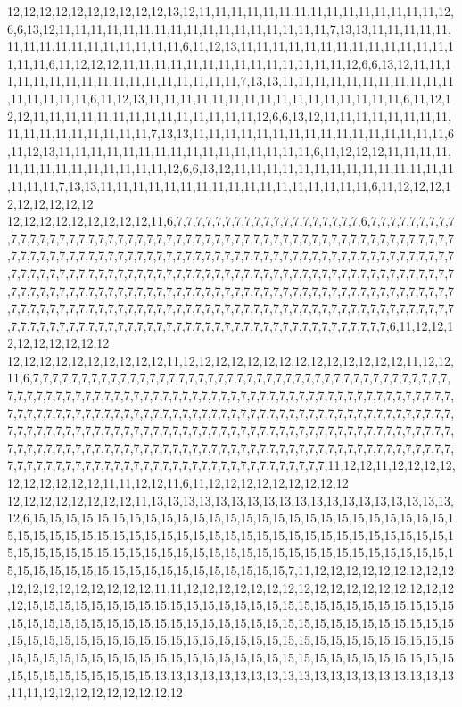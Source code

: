 12,12,12,12,12,12,12,12,12,12,13,12,11,11,11,11,11,11,11,11,11,11,11,11,11,11,11,12,6,6,13,12,11,11,11,11,11,11,11,11,11,11,11,11,11,11,11,11,11,7,13,13,11,11,11,11,11,11,11,11,11,11,11,11,11,11,11,11,6,11,12,13,11,11,11,11,11,11,11,11,11,11,11,11,11,11,11,11,6,11,12,12,12,11,11,11,11,11,11,11,11,11,11,11,11,11,11,12,6,6,13,12,11,11,11,11,11,11,11,11,11,11,11,11,11,11,11,11,11,7,13,13,11,11,11,11,11,11,11,11,11,11,11,11,11,11,11,11,6,11,12,13,11,11,11,11,11,11,11,11,11,11,11,11,11,11,11,11,6,11,12,12,12,11,11,11,11,11,11,11,11,11,11,11,11,11,11,12,6,6,13,12,11,11,11,11,11,11,11,11,11,11,11,11,11,11,11,11,11,7,13,13,11,11,11,11,11,11,11,11,11,11,11,11,11,11,11,11,6,11,12,13,11,11,11,11,11,11,11,11,11,11,11,11,11,11,11,11,6,11,12,12,12,11,11,11,11,11,11,11,11,11,11,11,11,11,11,12,6,6,13,12,11,11,11,11,11,11,11,11,11,11,11,11,11,11,11,11,11,7,13,13,11,11,11,11,11,11,11,11,11,11,11,11,11,11,11,11,11,6,11,12,12,12,12,12,12,12,12,12
12,12,12,12,12,12,12,12,12,11,6,7,7,7,7,7,7,7,7,7,7,7,7,7,7,7,7,7,7,7,6,7,7,7,7,7,7,7,7,7,7,7,7,7,7,7,7,7,7,7,7,7,7,7,7,7,7,7,7,7,7,7,7,7,7,7,7,7,7,7,7,7,7,7,7,7,7,7,7,7,7,7,7,7,7,7,7,7,7,7,7,7,7,7,7,7,7,7,7,7,7,7,7,7,7,7,7,7,7,7,7,7,7,7,7,7,7,7,7,7,7,7,7,7,7,7,7,7,7,7,7,7,7,7,7,7,7,7,7,7,7,7,7,7,7,7,7,7,7,7,7,7,7,7,7,7,7,7,7,7,7,7,7,7,7,7,7,7,7,7,7,7,7,7,7,7,7,7,7,7,7,7,7,7,7,7,7,7,7,7,7,7,7,7,7,7,7,7,7,7,7,7,7,7,7,7,7,7,7,7,7,7,7,7,7,7,7,7,7,7,7,7,7,7,7,7,7,7,7,7,7,7,7,7,7,7,7,7,7,7,7,7,7,7,7,7,7,7,7,7,7,7,7,7,7,7,7,7,7,7,7,7,7,7,7,7,7,7,7,7,7,7,7,7,7,7,7,7,7,7,7,7,7,7,7,7,7,7,7,7,7,7,7,7,7,7,7,7,7,7,7,7,7,7,7,7,7,7,7,6,11,12,12,12,12,12,12,12,12,12
12,12,12,12,12,12,12,12,12,12,11,12,12,12,12,12,12,12,12,12,12,12,12,12,12,11,12,12,11,6,7,7,7,7,7,7,7,7,7,7,7,7,7,7,7,7,7,7,7,7,7,7,7,7,7,7,7,7,7,7,7,7,7,7,7,7,7,7,7,7,7,7,7,7,7,7,7,7,7,7,7,7,7,7,7,7,7,7,7,7,7,7,7,7,7,7,7,7,7,7,7,7,7,7,7,7,7,7,7,7,7,7,7,7,7,7,7,7,7,7,7,7,7,7,7,7,7,7,7,7,7,7,7,7,7,7,7,7,7,7,7,7,7,7,7,7,7,7,7,7,7,7,7,7,7,7,7,7,7,7,7,7,7,7,7,7,7,7,7,7,7,7,7,7,7,7,7,7,7,7,7,7,7,7,7,7,7,7,7,7,7,7,7,7,7,7,7,7,7,7,7,7,7,7,7,7,7,7,7,7,7,7,7,7,7,7,7,7,7,7,7,7,7,7,7,7,7,7,7,7,7,7,7,7,7,7,7,7,7,7,7,7,7,7,7,7,7,7,7,7,7,7,7,7,7,7,7,7,7,7,7,7,7,7,7,7,7,7,7,7,7,7,7,7,7,7,7,7,7,7,7,7,7,7,7,7,7,7,7,7,11,12,12,11,12,12,12,12,12,12,12,12,12,12,11,11,12,12,11,6,11,12,12,12,12,12,12,12,12,12
12,12,12,12,12,12,12,12,11,13,13,13,13,13,13,13,13,13,13,13,13,13,13,13,13,13,13,13,12,6,15,15,15,15,15,15,15,15,15,15,15,15,15,15,15,15,15,15,15,15,15,15,15,15,15,15,15,15,15,15,15,15,15,15,15,15,15,15,15,15,15,15,15,15,15,15,15,15,15,15,15,15,15,15,15,15,15,15,15,15,15,15,15,15,15,15,15,15,15,15,15,15,15,15,15,15,15,15,15,15,15,15,15,15,15,15,15,15,15,15,15,15,15,15,15,15,15,15,15,15,7,11,12,12,12,12,12,12,12,12,12,12,12,12,12,12,12,12,12,12,11,11,12,12,12,12,12,12,12,12,12,12,12,12,12,12,12,12,12,12,15,15,15,15,15,15,15,15,15,15,15,15,15,15,15,15,15,15,15,15,15,15,15,15,15,15,15,15,15,15,15,15,15,15,15,15,15,15,15,15,15,15,15,15,15,15,15,15,15,15,15,15,15,15,15,15,15,15,15,15,15,15,15,15,15,15,15,15,15,15,15,15,15,15,15,15,15,15,15,15,15,15,15,15,15,15,15,15,15,15,15,15,15,15,15,15,15,15,15,15,15,15,15,15,15,15,15,15,15,15,15,15,15,15,15,15,15,15,15,15,13,13,13,13,13,13,13,13,13,13,13,13,13,13,13,13,13,13,13,11,11,12,12,12,12,12,12,12,12,12
